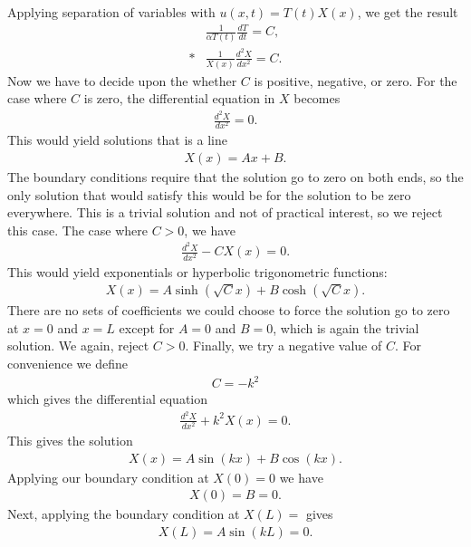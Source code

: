Applying separation of variables with $u(x,t) = T(t) X(x)$, we get the result
\begin{subequations}
\begin{align}
  &\frac{1}{\alpha T(t)} \frac{dT}{dt} = C , \nonumber \\*
  &\frac{1}{X(x)} \frac{d^2 X}{dx^2} = C . \nonumber
\end{align}
\end{subequations}
Now we have to decide upon the whether $C$ is positive, negative, or zero. For the case where $C$ is zero, the differential equation in $X$ becomes
\begin{align}
  \frac{d^2 X}{dx^2} = 0.
\end{align}
This would yield solutions that is a line 
\begin{align}
  X(x) = A x + B .
\end{align}
The boundary conditions require that the solution go to zero on both ends, so the only solution that would satisfy this would be for the solution to be zero everywhere. This is a trivial solution and not of practical interest, so we reject this case. The case where $C > 0$, we have
\begin{align}
  \frac{d^2 X}{dx^2} - C X(x) = 0.
\end{align}
This would yield exponentials or hyperbolic trigonometric functions: 
\begin{align}
  X(x) = A \sinh ( \sqrt{C} x ) + B \cosh ( \sqrt{C} x ) .
\end{align}
There are no sets of coefficients we could choose to force the solution go to zero at $x = 0$ and $x = L$ except for $A = 0$ and $B = 0$, which is again the trivial solution. We again, reject $C > 0$. Finally, we try a negative value of $C$. For convenience we define
\begin{align}
  C = -k^2
\end{align}
which gives the differential equation
\begin{align}
  \frac{d^2 X}{dx^2} + k^2 X(x) = 0.
\end{align}
This gives the solution
\begin{align}
  X(x) = A \sin( k x ) + B \cos ( k x ) .
\end{align}
Applying our boundary condition at $X(0) = 0$ we have
\begin{align}
  X(0) =  B  = 0 .
\end{align}
Next, applying the boundary condition at $X(L) = $ gives
\begin{align}
  X(L) = A \sin( k L ) = 0 .
\end{align}

